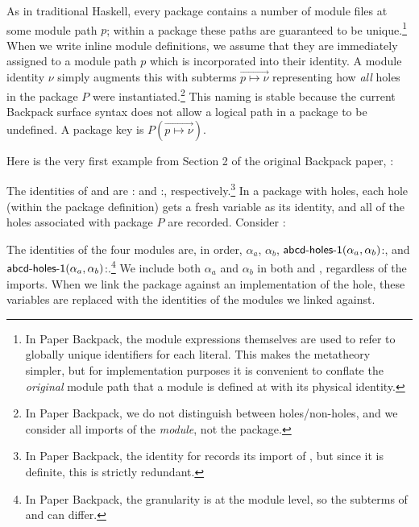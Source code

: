 \documentclass{article}
\begin{document}
As in traditional Haskell, every package contains a number of module
files at some module path $p$; within a package these paths are
guaranteed to be unique.\footnote{In Paper Backpack, the module expressions themselves are used to refer to globally unique identifiers for each literal.  This makes the metatheory simpler, but for implementation purposes it is convenient to conflate the \emph{original} module path that a module is defined at with its physical identity.}  When we write inline module definitions, we assume
that they are immediately assigned to a module path $p$ which is incorporated
into their identity.  A module identity $\nu$ simply augments this
with subterms $\vec{p\mapsto\nu}$ representing how \emph{all} holes in the package $P$
were instantiated.\footnote{In Paper Backpack, we do not distinguish between holes/non-holes, and we consider all imports of the \emph{module}, not the package.}  This naming is stable because the current Backpack surface syntax does not allow a logical path in a package
to be undefined.  A package key is $P(\vec{p\mapsto\nu})$.

Here is the very first example from
Section 2 of the original Backpack paper, :

\begin{example}
\end{example}

The identities of  and  are
: and :, respectively.\footnote{In Paper Backpack, the identity for  records its import of , but since it is definite, this is strictly redundant.} In a package with holes, each
hole (within the package definition) gets a fresh variable as its
identity, and all of the holes associated with package $P$ are recorded. Consider :

\begin{example}
\end{example}

The identities of the four modules
are, in order, $\alpha_a$, $\alpha_b$, $\textsf{abcd-holes-1}(\alpha_a,\alpha_b)$:, and
$\textsf{abcd-holes-1}(\alpha_a,\alpha_b)$:.\footnote{In Paper Backpack, the granularity is at the module level, so the subterms of  and  can differ.}  We include both $\alpha_a$ and $\alpha_b$ in both  and , regardless of the imports.  When we link the package against an implementation of the hole, these variables are replaced with the identities of the modules we linked against.
\end{document}
